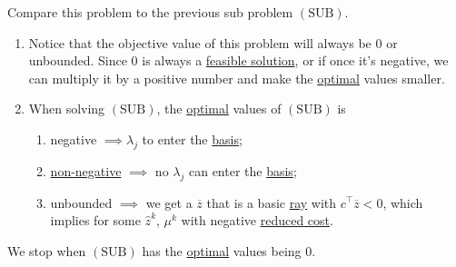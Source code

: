\begin{prev}
\begin{enumerate}[(a)]
		      \begin{remark}
			      Compare this problem to the previous sub problem \((\mathrm{SUB})\).
			      \begin{enumerate}
				      \item Notice that the objective value of this problem will always be \(0\) or unbounded. Since \(0\) is always a \hyperref[def:feasible-solution]{feasible solution}, or if once it's negative, we can multiply it by a positive number and make the \hyperref[def:optimal-solution]{optimal} values smaller.
				      \item When solving \((\mathrm{SUB})\), the \hyperref[def:optimal-solution]{optimal} values of \((\mathrm{SUB})\) is
				            \begin{enumerate}
					            \item negative \(\implies \lambda_{j}\) to enter the \hyperref[def:basis]{basis};
					            \item \underline{non-negative} \(\implies\) no \(\lambda_{j}\) can enter the \hyperref[def:basis]{basis};
					            \item unbounded \(\implies\) we get a \(\overline{z}\) that is a basic \hyperref[def:ray]{ray} with \(c^{\top}\overline{z} <0\), which implies for
					                  some \(\hat{z}^k\), \(\mu^k\) with negative \hyperref[def:reduced-cost]{reduced cost}.
				            \end{enumerate}
			      \end{enumerate}
			      \begin{note}
				      We stop when \((\mathrm{SUB})\) has the \hyperref[def:optimal-solution]{optimal} values being \(0\).
			      \end{note}
		      \end{remark}
	\end{enumerate}
\end{prev}

